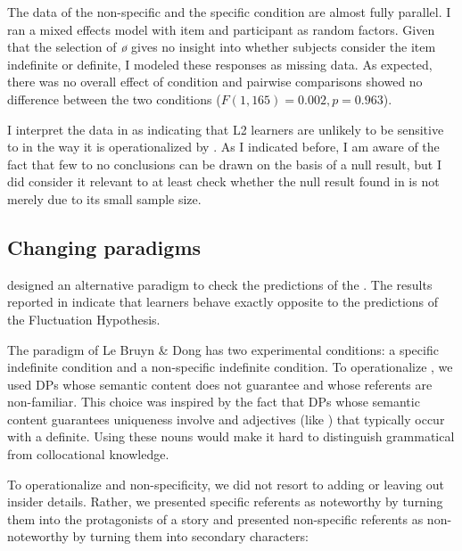 \documentclass[output=paper,
modfonts
]{langscibook}
\begin{document}
The data of the non-specific and the specific condition are almost fully parallel. I ran a mixed effects model with item and participant as random factors. Given that the selection of \textit{ø} gives no insight into whether subjects consider the item indefinite or definite, I modeled these responses as missing data. As expected, there was no overall effect of condition and pairwise comparisons showed no difference between the two conditions ($F(1, 165) = 0.002, p=0.963$).

I interpret the data in  as indicating that  L2 learners are unlikely to be sensitive to  in the way it is operationalized by \citet{IoninKoWexler2004}. As I indicated before, I am aware of the fact that few to no conclusions can be drawn on the basis of a null result, but I did consider it relevant to at least check whether the null result found in \citet{Ting2005} is not merely due to its small sample size.

\subsection{Changing paradigms}

\citet{LeBruynDong2017S} designed an alternative paradigm to check the predictions of the . The results reported in \citet{LeBruynDong2017T} indicate that  learners behave exactly opposite to the predictions of the Fluctuation Hypothesis.

The paradigm of Le Bruyn \& Dong has two experimental conditions: a specific indefinite condition and a non-specific indefinite condition. To operationalize , we used DPs whose semantic content does not guarantee  and whose referents are non-familiar. This choice was inspired by the fact that DPs whose semantic content guarantees uniqueness involve  and adjectives (like ) that typically occur with a definite. Using these nouns would make it hard to distinguish grammatical from collocational knowledge.

To operationalize  and non-specificity, we did not resort to adding or leaving out insider details. Rather, we presented specific referents as noteworthy by turning them into the protagonists of a story and presented non-specific referents as non-noteworthy by turning them into secondary characters:
\end{document}

